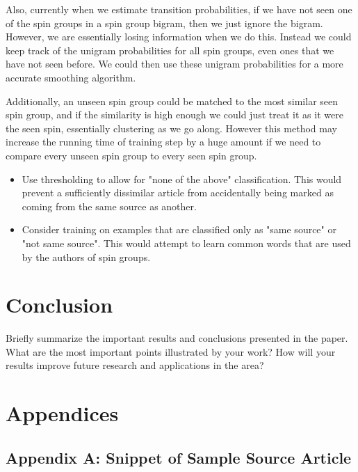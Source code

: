 \documentclass[11pt,letterpaper,oneside, titlepage]{scrartcl}
\begin{document}
Also, currently when we estimate transition probabilities, if we have not seen one of the spin groups in a spin group bigram, then we just ignore the bigram. However, we are essentially losing information when we do this. Instead we could keep track of the unigram probabilities for all spin groups, even ones that we have not seen before. We could then use these unigram probabilities for a more accurate smoothing algorithm. 

Additionally, an unseen spin group could be matched to the most similar seen spin group, and if the similarity is high enough we could just treat it as it were the seen spin, essentially clustering as we go along. However this method may increase the running time of training step by a huge amount if we need to compare every unseen spin group to every seen spin group.
 
\begin{itemize}

\item Use thresholding to allow for "none of the above" classification.  This would prevent a sufficiently dissimilar article from accidentally being marked as coming from the same source as another.

\item Consider training on examples that are classified only as "same source" or "not same source".  This would attempt to learn common words that are used by the authors of spin groups.

\end{itemize}


\section{Conclusion}

Briefly summarize the important results and conclusions presented in the paper. What are the most important points illustrated by your work? How will your results improve future research and applications in the area?

\section{Appendices}

\subsection{Appendix A: Snippet of Sample Source Article}
\end{document}
